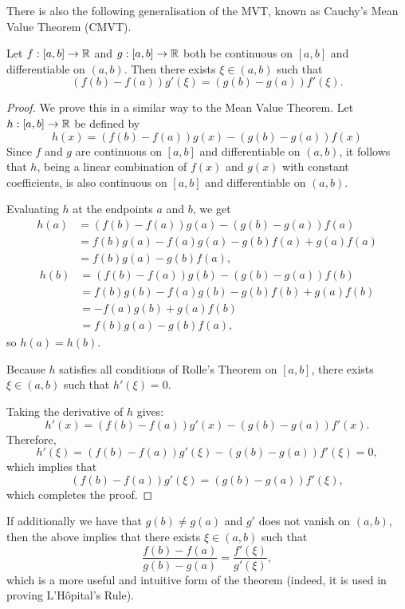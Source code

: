 \documentclass[../analysis1.tex]{subfiles}
\begin{document}
There is also the following generalisation of the MVT, known as Cauchy's Mean Value Theorem (CMVT).
\begin{theorem}
\label{thm:cmvt}
    \begin{shaded*}
        Let $f:[a,b]\to\mathbb{R}$ and $g:[a,b]\to\mathbb{R}$ both be continuous on $[a,b]$ and differentiable on $(a,b)$. Then there exists $\xi\in(a,b)$ such that
        \[(f(b)-f(a))g'(\xi)=(g(b)-g(a))f'(\xi).\]
    \end{shaded*}
\end{theorem}
\begin{proof}
    We prove this in a similar way to the Mean Value Theorem.
    Let $h:[a,b]\to\mathbb{R}$ be defined by
\[
h(x) = (f(b) - f(a))g(x) - (g(b) - g(a))f(x)
\]
Since $f$ and $g$ are continuous on $[a, b]$ and differentiable on $(a, b)$, it follows that $h$, being a linear combination of $f(x)$ and $g(x)$ with constant coefficients, is also continuous on $[a, b]$ and differentiable on $(a, b)$.

Evaluating $h$ at the endpoints $a$ and $b$, we get
\begin{align*}
h(a) &= (f(b) - f(a))g(a) - (g(b) - g(a))f(a) \\
     &= f(b)g(a) - f(a)g(a) - g(b)f(a) + g(a)f(a) \\
     &= f(b)g(a) - g(b)f(a),
\end{align*}
\begin{align*}
h(b) &= (f(b) - f(a))g(b) - (g(b) - g(a))f(b) \\
     &= f(b)g(b) - f(a)g(b) - g(b)f(b) + g(a)f(b) \\
     &= -f(a)g(b) + g(a)f(b) \\
     &= f(b)g(a) - g(b)f(a),
\end{align*}
so $h(a) = h(b)$.

Because $h$ satisfies all conditions of Rolle's Theorem on $[a, b]$, there exists $\xi \in (a, b)$ such that $h'(\xi) = 0$.

Taking the derivative of $h$ gives:
\[
h'(x) = (f(b) - f(a))g'(x) - (g(b) - g(a))f'(x).
\]
Therefore,
\[
h'(\xi) = (f(b) - f(a))g'(\xi) - (g(b) - g(a))f'(\xi) = 0,
\]
which implies that
\[
(f(b) - f(a))g'(\xi) = (g(b) - g(a))f'(\xi),
\]
which completes the proof.\qedhere
\end{proof}
\begin{remark}
    If additionally we have that $g(b)\ne g(a)$ and $g'$ does not vanish on $(a,b)$, then the above implies that there exists $\xi\in(a,b)$ such that
    \[\frac{f(b)-f(a)}{g(b)-g(a)}=\frac{f'(\xi)}{g'(\xi)},\]
    which is a more useful and intuitive form of the theorem (indeed, it is used in proving L'Hôpital's Rule).
\end{remark}
\end{document}
